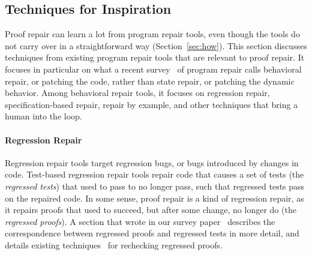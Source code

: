 \subsection{Techniques for Inspiration}
\label{sec:techniques}


Proof repair can learn a lot from program repair tools, even though the tools do not carry over in a straightforward way (Section~\ref{sec:how}).
This section discusses techniques from existing program repair tools that are relevant to proof repair.
It focuses in particular on what a recent survey~\cite{Monperrus:2018:ASR:3177787.3105906} of program repair calls behavioral repair,
or patching the code, rather than state repair, or patching the dynamic behavior.
Among behavioral repair tools, it focuses on regression repair, specification-based repair,
repair by example, and other techniques that bring a human into the loop.

\paragraph{Regression Repair}
Regression repair tools target regression bugs, or bugs introduced by changes in code.
Test-based regression repair tools repair code that causes a set of tests (the \textit{regressed tests}) that used to pass to no longer pass,
such that regressed tests pass on the repaired code.
In some sense, proof repair is a kind of regression repair, as it repairs
proofs that used to succeed, but after some change, no longer do (the \textit{regressed proofs}).
A section that  wrote in our survey paper~\cite{PGL-045} describes the correspondence between regressed proofs and regressed tests in more detail,
and details existing techniques~\cite{Palmskog2018, Wenzel2013MultiProcessing, Barras2013, Celik:2017:IRP:3155562.3155588, Wenzel2013, Barras2015, deMoura2015, Wenzel2014, WenzelScalingIsabelle, WenzelFurtherScalingIsabelle} for rechecking regressed proofs.

